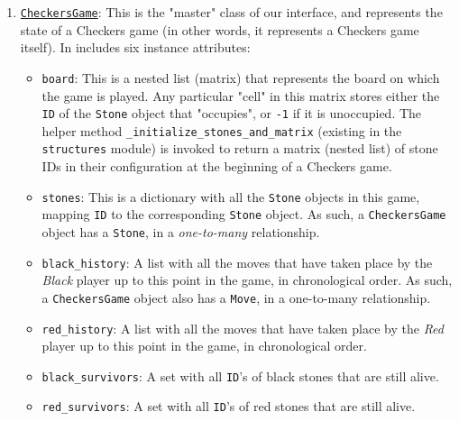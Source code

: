 \documentclass[fontsize=11pt]{article}
\begin{document}
\begin{enumerate}
    
    \item \underline{\texttt{CheckersGame}}: This is the "master" class of our interface, and represents the state of a Checkers game (in other words, it represents a Checkers game itself). In includes six instance attributes:
    \begin{itemize}
        \item \texttt{board}: This is a nested list (matrix) that represents the board on which the game is played. Any particular "cell" in this matrix stores either the \texttt{ID} of the \texttt{Stone} object that "occupies", or \texttt{-1} if it is unoccupied. The helper method \texttt{\_initialize\_stones\_and\_matrix} (existing in the \texttt{structures} module) is invoked to return a matrix (nested list) of stone IDs in their configuration at the beginning of a Checkers game.

        \item \texttt{stones}: This is a dictionary with all the \texttt{Stone} objects in this game, mapping \texttt{ID} to the corresponding \texttt{Stone} object. As such, a \texttt{CheckersGame} object has a \texttt{Stone}, in a \textit{one-to-many} relationship.

        \item \texttt{black\_history}: A list with all the moves that have taken place by the \textit{Black} player up to this point in the game, in chronological order. As such, a \texttt{CheckersGame} object also has a \texttt{Move}, in a one-to-many relationship.

        \item \texttt{red\_history}: A list with all the moves that have taken place by the \textit{Red} player up to this point in the game, in chronological order.

        \item \texttt{black\_survivors}: A set with all \texttt{ID}'s of black stones that are still alive.

        \item \texttt{red\_survivors}: A set with all \texttt{ID}'s of red stones that are still alive.
    \end{itemize}


\end{enumerate}
\end{document}
